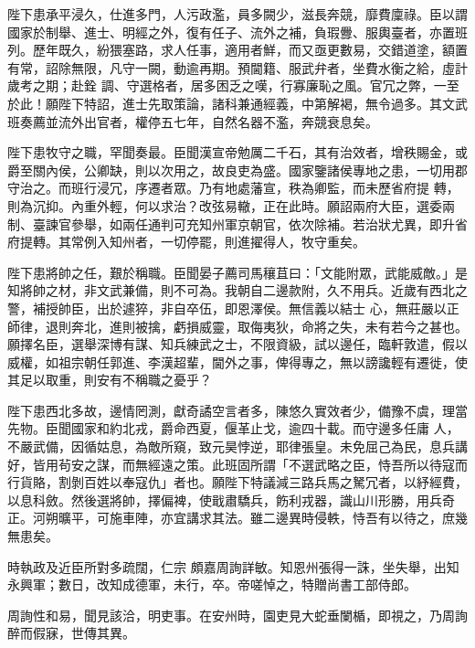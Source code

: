 \begin{pinyinscope}
 陛下患承平浸久，仕進多門，人污政濫，員多闕少，滋長奔競，靡費廩祿。臣以謂國家於制舉、進士、明經之外，復有任子、流外之補，負瑕釁、服輿臺者，亦置班列。歷年既久，紛猥塞路，求人任事，適用者鮮，而又亟更數易，交錯道塗，額置有常，詔除無限，凡守一闕，動逾再期。預閫籍、服武弁者，坐費水衡之給，虛計歲考之期；赴銓
 調、守選格者，居多困乏之嘆，行寡廉恥之風。官冗之弊，一至於此！願陛下特詔，進士先取策論，諸科兼通經義，中第解褐，無令過多。其文武班奏薦並流外出官者，權停五七年，自然名器不濫，奔競衰息矣。



 陛下患牧守之職，罕聞奏最。臣聞漢宣帝勉厲二千石，其有治效者，增秩賜金，或爵至關內侯，公卿缺，則以次用之，故良吏為盛。國家鑒諸侯專地之患，一切用郡守治之。而班行浸冗，序遷者眾。乃有地處藩宣，秩為卿監，而未歷省府提
 轉，則為沉抑。內重外輕，何以求治？改弦易轍，正在此時。願詔兩府大臣，選委兩制、臺諫官參舉，如兩任通判可充知州軍京朝官，依次除補。若治狀尤異，即升省府提轉。其常例入知州者，一切停罷，則進擢得人，牧守重矣。



 陛下患將帥之任，艱於稱職。臣聞晏子薦司馬穰苴曰：「文能附眾，武能威敵。」是知將帥之材，非文武兼備，則不可為。我朝自二邊款附，久不用兵。近歲有西北之警，補授帥臣，出於遽猝，非自卒伍，即恩澤侯。無信義以結士
 心，無莊嚴以正師律，退則奔北，進則被擒，虧損威靈，取侮夷狄，命將之失，未有若今之甚也。願擇名臣，選舉深博有謀、知兵練武之士，不限資級，試以邊任，臨軒敦遣，假以威權，如祖宗朝任郭進、李漢超輩，閫外之事，俾得專之，無以謗讒輕有遷徙，使其足以取重，則安有不稱職之憂乎？



 陛下患西北多故，邊情罔測，獻奇譎空言者多，陳悠久實效者少，備豫不虞，理當先物。臣聞國家和約北戎，爵命西夏，偃革止戈，逾四十載。而守邊多任庸
 人，不嚴武備，因循姑息，為敵所窺，致元昊悖逆，耶律張皇。未免屈己為民，息兵講好，皆用茍安之謀，而無經遠之策。此班固所謂「不選武略之臣，恃吾所以待寇而行貨賂，割剝百姓以奉寇仇」者也。願陛下特議減三路兵馬之駑冗者，以紓經費，以息科斂。然後選將帥，擇偏裨，使戢肅驕兵，飭利戎器，識山川形勝，用兵奇正。河朔曠平，可施車陣，亦宜講求其法。雖二邊異時侵軼，恃吾有以待之，庶幾無患矣。



 時執政及近臣所對多疏闊，仁宗
 頗嘉周詢詳敏。知恩州張得一誅，坐失舉，出知永興軍；數日，改知成德軍，未行，卒。帝嗟悼之，特贈尚書工部侍郎。



 周詢性和易，聞見該洽，明吏事。在安州時，園吏見大蛇垂闌楯，即視之，乃周詢醉而假寐，世傳其異。




\end{pinyinscope}
